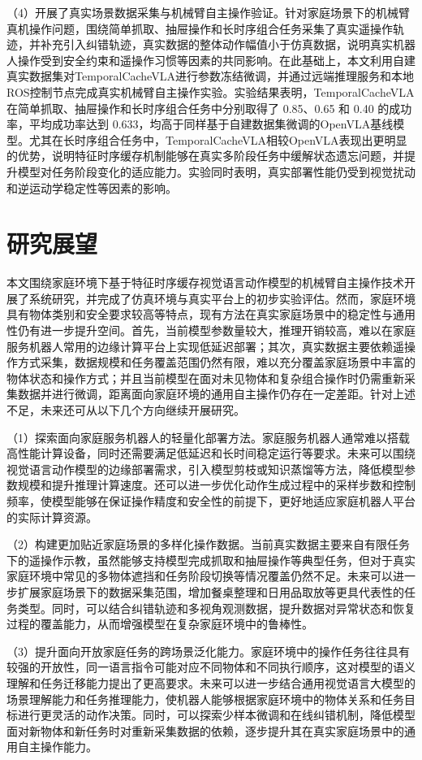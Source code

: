 （4）开展了真实场景数据采集与机械臂自主操作验证。针对家庭场景下的机械臂真机操作问题，围绕简单抓取、抽屉操作和长时序组合任务采集了真实遥操作轨迹，并补充引入纠错轨迹，真实数据的整体动作幅值小于仿真数据，说明真实机器人操作受到安全约束和遥操作习惯等因素的共同影响。在此基础上，本文利用自建真实数据集对TemporalCacheVLA进行参数冻结微调，并通过远端推理服务和本地ROS控制节点完成真实机械臂自主操作实验。实验结果表明，TemporalCacheVLA在简单抓取、抽屉操作和长时序组合任务中分别取得了 0.85、0.65 和 0.40 的成功率，平均成功率达到 0.633，均高于同样基于自建数据集微调的OpenVLA基线模型。尤其在长时序组合任务中，TemporalCacheVLA相较OpenVLA表现出更明显的优势，说明特征时序缓存机制能够在真实多阶段任务中缓解状态遗忘问题，并提升模型对任务阶段变化的适应能力。实验同时表明，真实部署性能仍受到视觉扰动和逆运动学稳定性等因素的影响。

\section{研究展望}
\label{sec:future_work}

本文围绕家庭环境下基于特征时序缓存视觉语言动作模型的机械臂自主操作技术开展了系统研究，并完成了仿真环境与真实平台上的初步实验评估。然而，家庭环境具有物体类别和安全要求较高等特点，现有方法在真实家庭场景中的稳定性与通用性仍有进一步提升空间。首先，当前模型参数量较大，推理开销较高，难以在家庭服务机器人常用的边缘计算平台上实现低延迟部署；其次，真实数据主要依赖遥操作方式采集，数据规模和任务覆盖范围仍然有限，难以充分覆盖家庭场景中丰富的物体状态和操作方式；并且当前模型在面对未见物体和复杂组合操作时仍需重新采集数据并进行微调，距离面向家庭环境的通用自主操作仍存在一定差距。针对上述不足，未来还可从以下几个方向继续开展研究。

（1）探索面向家庭服务机器人的轻量化部署方法。家庭服务机器人通常难以搭载高性能计算设备，同时还需要满足低延迟和长时间稳定运行等要求。未来可以围绕视觉语言动作模型的边缘部署需求，引入模型剪枝或知识蒸馏等方法，降低模型参数规模和提升推理计算速度。还可以进一步优化动作生成过程中的采样步数和控制频率，使模型能够在保证操作精度和安全性的前提下，更好地适应家庭机器人平台的实际计算资源。

（2）构建更加贴近家庭场景的多样化操作数据。当前真实数据主要来自有限任务下的遥操作示教，虽然能够支持模型完成抓取和抽屉操作等典型任务，但对于真实家庭环境中常见的多物体遮挡和任务阶段切换等情况覆盖仍然不足。未来可以进一步扩展家庭场景下的数据采集范围，增加餐桌整理和日用品取放等更具代表性的任务类型。同时，可以结合纠错轨迹和多视角观测数据，提升数据对异常状态和恢复过程的覆盖能力，从而增强模型在复杂家庭环境中的鲁棒性。

（3）提升面向开放家庭任务的跨场景泛化能力。家庭环境中的操作任务往往具有较强的开放性，同一语言指令可能对应不同物体和不同执行顺序，这对模型的语义理解和任务迁移能力提出了更高要求。未来可以进一步结合通用视觉语言大模型的场景理解能力和任务推理能力，使机器人能够根据家庭环境中的物体关系和任务目标进行更灵活的动作决策。同时，可以探索少样本微调和在线纠错机制，降低模型面对新物体和新任务时对重新采集数据的依赖，逐步提升其在真实家庭场景中的通用自主操作能力。

